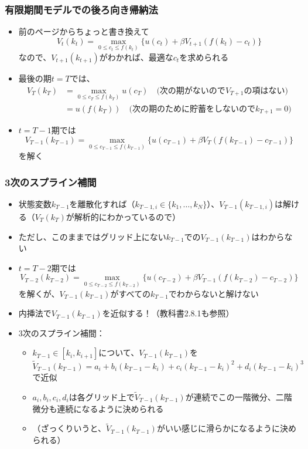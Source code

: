 \documentclass[unicode,9pt]{beamer}%
\begin{document}
\begin{frame}\frametitle{有限期間モデルでの後ろ向き帰納法}
  \begin{itemize}
      \item 前のページからちょっと書き換えて
        $$
        V_t(k_t) = \max_{0 \le c_t \le f(k_t)} \{u(c_t) + \beta V_{t+1}(f(k_t) - c_t)\}
        $$
        なので、$V_{t+1}(k_{t+1})$がわかれば、最適な$c_t$を求められる
      \item 最後の期$t=T$では、
        \begin{align*}
          V_T(k_T)
          &= \max_{0 \le c_T \le f(k_T)} u(c_T) \quad \text{(次の期がないので$V_{T+1}$の項はない)} \\
          &= u(f(k_T)) \quad \text{(次の期のために貯蓄をしないので$k_{T+1}=0$)}
        \end{align*}
      \item $t=T-1$期では
        $$
        V_{T-1}(k_{T-1}) = \max_{0 \le c_{T-1} \le f(k_{T-1})} \{u(c_{T-1}) + \beta V_{T}(f(k_{T-1}) - c_{T-1})\}
        $$
        を解く
  \end{itemize}
\end{frame}

\begin{frame}\frametitle{3次のスプライン補間}
  \begin{itemize}
    \item 状態変数$k_{T-1}$を離散化すれば（$k_{{T-1}, i} \in \{k_1, \dots, k_N \}$）、$V_{T-1}(k_{T-1, i})$は解ける（$V_T(k_T)$が解析的にわかっているので）
    \item ただし、このままではグリッド上にない$k_{T-1}$での$V_{T-1}(k_{T-1})$はわからない
      \item $t=T-2$期では
        $$
        V_{T-2}(k_{T-2}) = \max_{0 \le c_{T-2} \le f(k_{T-2})} \{u(c_{T-2}) + \beta V_{T-1}(f(k_{T-2}) - c_{T-2})\}
        $$
        を解くが、$V_{T-1}(k_{T-1})$がすべての$k_{T-1}$でわからないと解けない
    \item 内挿法で$V_{T-1}(k_{T-1})$を近似する！（教科書2.8.1も参照）
    \item 3次のスプライン補間：
      \begin{itemize}
        \item $k_{T-1} \in [k_{i}, k_{i+1}]$について、$V_{T-1}(k_{T-1})$を$\tilde{V}_{T-1}(k_{T-1}) = a_i + b_i (k_{T-1} - k_i) + c_i (k_{T-1} - k_i)^2 + d_i (k_{T-1} - k_i)^3$で近似
        \item $a_i, b_i, c_i, d_i$は各グリッド上で$\tilde{V}_{T-1}(k_{T-1})$が連続でこの一階微分、二階微分も連続になるように決められる
        \item （ざっくりいうと、$\tilde{V}_{T-1}(k_{T-1})$がいい感じに滑らかになるように決められる）
      \end{itemize}
  \end{itemize}
\end{frame}
\end{document}
